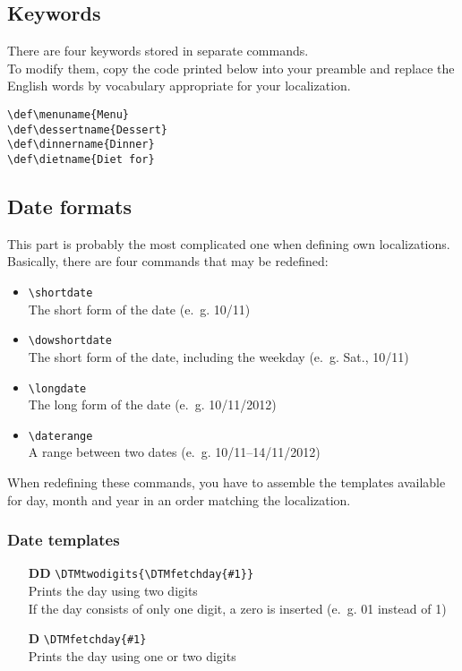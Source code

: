 \documentclass[11pt]{ltxdoc}
\begin{document}
	
	\subsection{Keywords}
	There are four keywords stored in separate commands. \\
	To modify them, copy the code printed below into your preamble and replace the English words by vocabulary appropriate for your localization.
	
	\medskip
	\verb|\def\menuname{Menu}| \\
	\verb|\def\dessertname{Dessert}| \\
	\verb|\def\dinnername{Dinner}| \\
	\verb|\def\dietname{Diet for}|
	
	
	\subsection{Date formats}
	This part is probably the most complicated one when defining own localizations. \\
	Basically, there are four commands that may be redefined:
	\begin{itemize}
		\item \verb|\shortdate| \\
		The short form of the date (e.~g. 10/11)
		
		\item \verb|\dowshortdate| \\
		The short form of the date, including the weekday (e.~g. Sat., 10/11)
		
		\item \verb|\longdate| \\
		The long form of the date (e.~g. 10/11/2012)
		
		\item \verb|\daterange| \\
		A range between two dates (e.~g. 10/11--14/11/2012)
	\end{itemize}
	
	\medskip
	When redefining these commands, you have to assemble the templates available for day, month and year in an order matching the localization.
	
	\subsubsection*{Date templates}
	\begin{itemize}
		\item[\sffamily\bfseries DD]
		\verb|\DTMtwodigits{\DTMfetchday{#1}}| \\
		Prints the day using two digits \\
		If the day consists of only one digit, a zero is inserted  (e.~g. 01 instead of 1)
		
		\item[\sffamily\bfseries D]
		\verb|\DTMfetchday{#1}| \\
		Prints the day using one or two digits
	\end{itemize}
	
\end{document}

